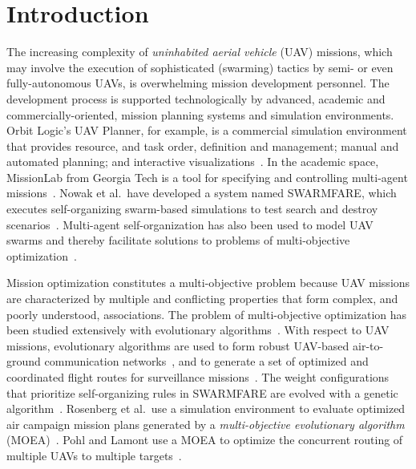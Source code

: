 \chapter{Introduction}

The increasing complexity of \emph{uninhabited aerial vehicle} (UAV) missions, which may involve the execution of sophisticated (swarming) tactics by semi- or even fully-autonomous UAVs, is overwhelming mission development personnel. The development process is supported technologically by advanced, academic and commercially-oriented, mission planning systems and simulation environments. Orbit Logic's UAV Planner, for example, is a commercial simulation environment that provides resource, and task order, definition and management; manual and automated planning; and interactive visualizations~\cite{orbitlogic}. In the academic space, MissionLab from Georgia Tech is a tool for specifying and controlling multi-agent missions~\cite{gatech}. Nowak et al.\ have developed a system named SWARMFARE, which executes self-organizing swarm-based simulations to test search and destroy scenarios~\cite{Nowak_2007}. Multi-agent self-organization has also been used to model UAV swarms and thereby facilitate solutions to problems of multi-objective optimization~\cite{Perron_2008,Nowak_2008}.

Mission optimization constitutes a multi-objective problem because UAV missions are characterized by multiple and conflicting properties that form complex, and poorly understood, associations. The problem of multi-objective optimization has been studied extensively with evolutionary algorithms~\cite{Zitzler_2004}. With respect to UAV missions, evolutionary algorithms are used to form robust UAV-based air-to-ground communication networks~\cite{Agogino_2012}, and to generate a set of optimized and coordinated flight routes for surveillance missions~\cite{Stouch_2011}. The weight configurations that prioritize self-organizing rules in SWARMFARE are evolved with a genetic algorithm~\cite{Nowak_2007}. Rosenberg et al.\ use a simulation environment to evaluate optimized air campaign mission plans generated by a \emph{multi-objective evolutionary algorithm} (MOEA)~\cite{Rosenberg_2008}. Pohl and Lamont use a MOEA to optimize the concurrent routing of multiple UAVs to multiple targets~\cite{Pohl_2008}.

